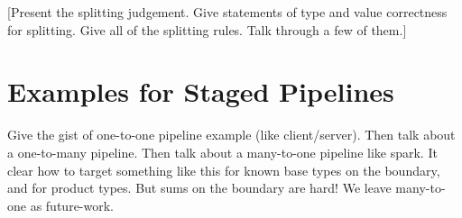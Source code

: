 


[Present the splitting judgement.  Give statements of type and value correctness for splitting.  Give all of the splitting rules.  Talk through a few of them.]

\section{Examples for Staged Pipelines}

Give the gist of one-to-one pipeline example (like client/server).
Then talk about a one-to-many pipeline.
Then talk about a many-to-one pipeline like spark.  It clear how to target something like this for known base types on the boundary, and for product types.  But sums on the boundary are hard!  We leave many-to-one as future-work.
